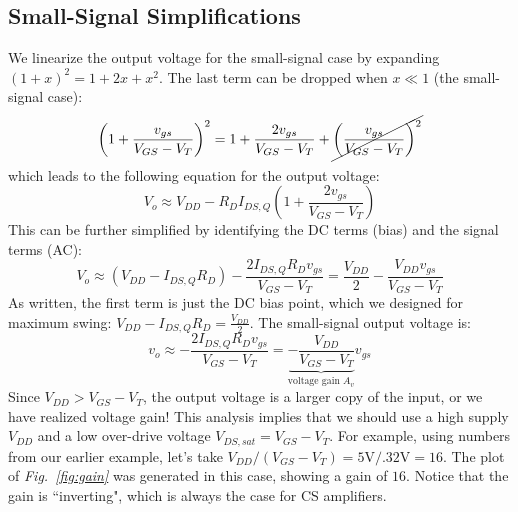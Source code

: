 \subsection{Small-Signal Simplifications}
We linearize the output voltage for the small-signal case by expanding  $(1+x)^2 = 1 + 2x + x^2$.  The last term can be dropped when $x \ll 1$ (the small-signal case):
    \begin{equation}
        {\left( {1 + \frac{{{v_{gs}}}}{{{V_{GS}} - {V_T}}}} \right)^2} = 1 + \frac{{2{v_{gs}}}}{{{V_{GS}} - {V_T}}} + \cancel{\left( {\frac{{{v_{gs}}}}	{{{V_{GS}} - {V_T}}}} \right)^2}
    \end{equation}
which leads to the following equation for the output voltage:
    \begin{equation}
        {V_o} \approx {V_{DD}} - {R_D}{I_{DS,Q}}\left( {1 + \frac{{2{v_{gs}}}}{{{V_{GS}} - {V_T}}}} \right)
    \end{equation}
This can be further simplified by identifying the DC terms (bias) and the signal terms (AC):
    \begin{equation}
        {V_o} \approx ({V_{DD}} - {I_{DS,Q}}{R_{D}}) - \frac{{2{I_{DS,Q}}{R_{D}}{v_{gs}}}}{{{V_{GS}} - {V_T}}} = \frac{{{V_{DD}}}}{2} - \frac{{{V_{DD}}{v_{gs}}}}{{{V_{GS}} - {V_T}}}
    \end{equation}
As written, the first term is just the DC bias point, which we designed for maximum swing:  $V_{DD} - I_{DS,Q} R_{D} = \frac{V_{DD}}{2}$.  The small-signal output voltage is:
    \begin{equation}
        v_o \approx  - \frac{2I_{DS,Q} R_{D} v_{gs}}{V_{GS} - V_T} = \underbrace{ - \frac{V_{DD}}{V_{GS} - V_T}}_{\text{voltage gain } A_v}  v_{gs}
    \end{equation}
Since $V_{DD} > V_{GS} - V_T$, the output voltage is a larger copy of the input, or we have realized voltage gain!  This analysis implies that we should use a high supply $V_{DD}$ and a low over-drive voltage $V_{DS,sat} = V_{GS} - V_T$.  For example, using numbers from our earlier example, let's take $V_{DD} / (V_{GS} - V_T) = 5\mathrm{V}/.32\mathrm{V} = 16$.  The plot of \emph{Fig.~\ref{fig:gain}} was generated in this case, showing a gain of $16$.  Notice that the gain is ``inverting", which is always the case for CS amplifiers.
